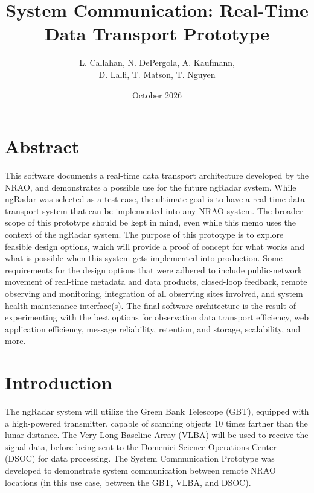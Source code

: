 \documentclass[12pt]{article}
\title{System Communication: Real-Time Data Transport Prototype}
\author{L. Callahan, N. DePergola, A. Kaufmann,\\D. Lalli, T. Matson, T. Nguyen}
\date{October 2026}
\begin{document}
\maketitle %


\section*{Abstract}

This software documents a real-time data transport architecture developed by the NRAO, and demonstrates a possible use for the future ngRadar system. While ngRadar was selected as a test case, the ultimate goal is to have a real-time data transport system that can be implemented into any NRAO system. The broader scope of this prototype should be kept in mind, even while this memo uses the context of the ngRadar system. The purpose of this prototype is to explore feasible design options, which will provide a proof of concept for what works and what is possible when this system gets implemented into production. Some requirements for the design options that were adhered to include public-network movement of real-time metadata and data products, closed-loop feedback, remote observing and monitoring, integration of all observing sites involved, and system health maintenance interface(s). The final software architecture is the result of experimenting with the best options for observation data transport efficiency, web application efficiency, message reliability, retention, and storage, scalability, and more. 


\section{Introduction} \label{Introduction}

The ngRadar system will utilize the Green Bank Telescope (GBT), equipped with a high-powered transmitter, capable of scanning objects 10 times farther than the lunar distance. The Very Long Baseline Array (VLBA) will be used to receive the signal data, before being sent to the Domenici Science Operations Center (DSOC) for data processing. The System Communication Prototype was developed to demonstrate system communication between remote NRAO locations (in this use case, between the GBT, VLBA, and DSOC). 
\end{document}
